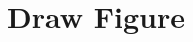 \documentclass[a4paper,11pt]{article}
\begin{document}
\section{Draw Figure}

% 

% 


\end{document}
